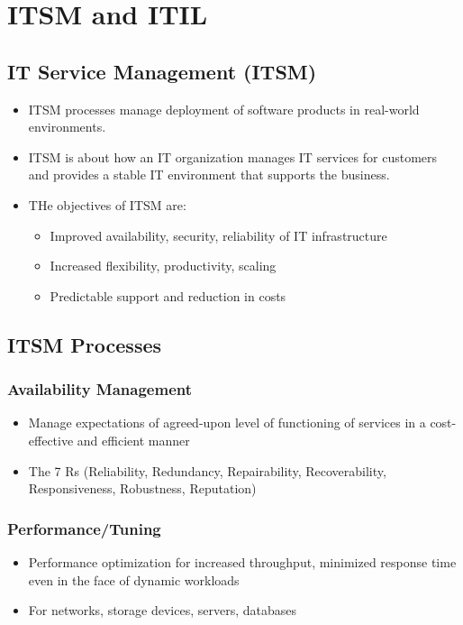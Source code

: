 \documentclass{article}
\begin{document}
\section{ITSM and ITIL}
\subsection{IT Service Management (ITSM)}
\begin{itemize}
    \item ITSM processes manage deployment of software products in real-world environments. 
    
    \item ITSM is about how an IT organization manages IT services for customers and provides a stable IT environment that supports the business. 
    
    \item THe objectives of ITSM are:
    \begin{itemize}
        \item Improved availability, security, reliability of IT infrastructure
        
        \item Increased flexibility, productivity, scaling
        
        \item Predictable support and reduction in costs
    \end{itemize}
\end{itemize}

\subsection{ITSM Processes}
\subsubsection{Availability Management}
\begin{itemize}
    \item Manage expectations of agreed-upon level of functioning of services in a cost-effective and efficient manner
    
    \item The 7 Rs (Reliability, Redundancy, Repairability, Recoverability, Responsiveness, Robustness, Reputation)
\end{itemize}

\subsubsection{Performance/Tuning}
\begin{itemize}
    \item Performance optimization for increased throughput, minimized response time even in the face of dynamic workloads
    
    \item For networks, storage devices, servers, databases
\end{itemize}
\end{document}
